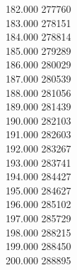 { 182.000	277760 \\
 183.000	278151 \\
 184.000	278814 \\
 185.000	279289 \\
 186.000	280029 \\
 187.000	280539 \\
 188.000	281056 \\
 189.000	281439 \\
 190.000	282103 \\
 191.000	282603 \\
 192.000	283267 \\
 193.000	283741 \\
 194.000	284427 \\
 195.000	284627 \\
 196.000	285102 \\
 197.000	285729 \\
 198.000	288215 \\
 199.000	288450 \\
 200.000	288895 \\
}
